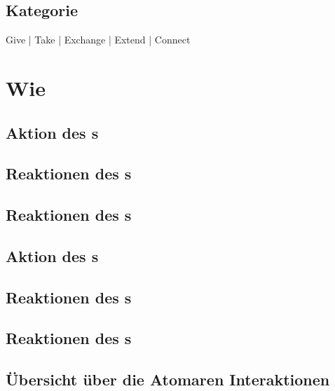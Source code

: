 \subsection*{Kategorie}
 Give   |   
 Take   |   
 Exchange   |   
 Extend   |   
 Connect

\newpage
\section*{Wie}

\ifx\swapReactions\undefined
	\subsection*{Aktion des \sen s}
	\useraction

	\subsection*{Reaktionen des \sendev s}
	\reactionSen

	\subsection*{Reaktionen des \recdev s}
	\reactionRec
\else
	\subsection*{Aktion des \rec s}
	\useraction
	
	\subsection*{Reaktionen des \recdev s}
	\reactionRec
	
	\subsection*{Reaktionen des \sendev s}
	\reactionSen
\fi


\subsection*{Übersicht über die Atomaren Interaktionen}
\microinteractionstabular

